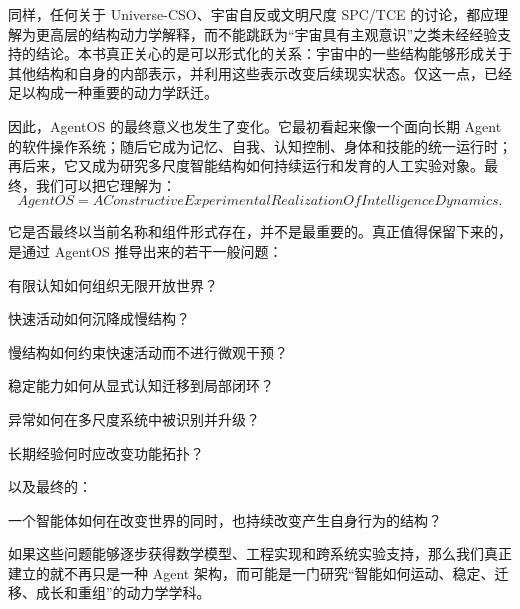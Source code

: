同样，任何关于 Universe-CSO、宇宙自反或文明尺度 SPC/TCE 的讨论，都应理解为更高层的结构动力学解释，而不能跳跃为“宇宙具有主观意识”之类未经经验支持的结论。本书真正关心的是可以形式化的关系：宇宙中的一些结构能够形成关于其他结构和自身的内部表示，并利用这些表示改变后续现实状态。仅这一点，已经足以构成一种重要的动力学跃迁。

因此，AgentOS 的最终意义也发生了变化。它最初看起来像一个面向长期 Agent 的软件操作系统；随后它成为记忆、自我、认知控制、身体和技能的统一运行时；再后来，它又成为研究多尺度智能结构如何持续运行和发育的人工实验对象。最终，我们可以把它理解为：
\begin{equation}
\boxed{
AgentOS
=
A Constructive Experimental Realization
Of Intelligence Dynamics.
}
\end{equation}

它是否最终以当前名称和组件形式存在，并不是最重要的。真正值得保留下来的，是通过 AgentOS 推导出来的若干一般问题：

\begin{statementbox}
有限认知如何组织无限开放世界？
\end{statementbox}

\begin{statementbox}
快速活动如何沉降成慢结构？
\end{statementbox}

\begin{statementbox}
慢结构如何约束快速活动而不进行微观干预？
\end{statementbox}

\begin{statementbox}
稳定能力如何从显式认知迁移到局部闭环？
\end{statementbox}

\begin{statementbox}
异常如何在多尺度系统中被识别并升级？
\end{statementbox}

\begin{statementbox}
长期经验何时应改变功能拓扑？
\end{statementbox}

以及最终的：

\begin{statementbox}
一个智能体如何在改变世界的同时，也持续改变产生自身行为的结构？
\end{statementbox}

如果这些问题能够逐步获得数学模型、工程实现和跨系统实验支持，那么我们真正建立的就不再只是一种 Agent 架构，而可能是一门研究“智能如何运动、稳定、迁移、成长和重组”的动力学学科。

